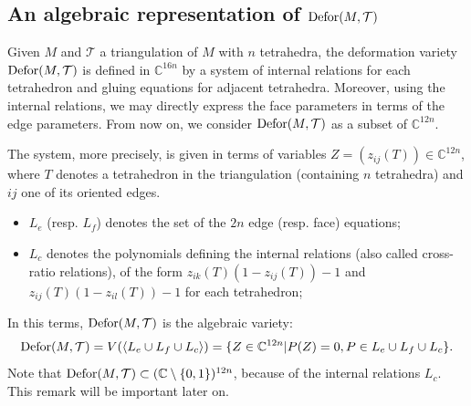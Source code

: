 \subsection{An algebraic representation of $\operatorname{Defor} ( M, \mathcal{T} )$}\label{ss:equations}

Given $M$ and $\mathcal{T}$ a triangulation of $M$ with $n$ tetrahedra, the
deformation variety $\operatorname{Defor} (M, \mathcal{T} )$ is defined in
$\mathbb{C}^{16n}$ by a system of internal relations for each tetrahedron and
gluing equations for adjacent tetrahedra. Moreover, using the internal
relations, we may directly express the face parameters in terms of the edge
parameters. From now on, we consider $\operatorname{Defor} (M, \mathcal{T} )$ as a
subset of $\mathbb{C}^{12n}$.

The system, more precisely, is given in terms of variables $Z= (z_{ij} (T))
\in \mathbb{C}^{12n}$, where $T$ denotes a tetrahedron in the triangulation
(containing $n$ tetrahedra) and $ij$ one of its oriented edges.
\begin{itemize}
  \item $L_{e}$ (resp. $L_{f}$) denotes the set of the $2n$ edge (resp. face)
  equations;
  
  \item $L_{c}$ denotes the polynomials defining the internal relations (also
  called cross-ratio relations), of the form $z_{ik} (T)  (1-z_{ij} (T)) -1$
  and $z_{ij} (T)  (1-z_{il} (T)) -1$ for each tetrahedron;
\end{itemize}
In this terms, $\operatorname{Defor} (M, \mathcal{T} )$ is the algebraic variety:
\[ \operatorname{Defor} (M, \mathcal{T} ) =V ( \langle L_{e} \cup L_{f} \cup L_{c}
   \rangle ) = \{{Z} \in \mathbb{C}^{12n} |P(Z)=0,P \in L_{e} \cup
   L_{f} \cup L_{c} \} . \]
Note that $\operatorname{Defor} (M, \mathcal{T} ) \subset (\mathbb{C} \setminus
\{0,1\})^{12n}$, because of the internal relations $L_{c}$. This remark will be important later on.

